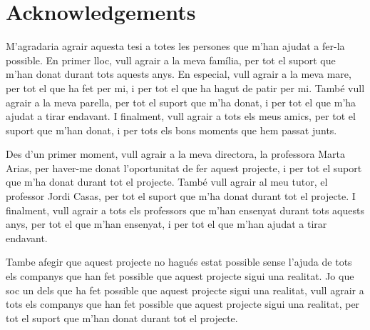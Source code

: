 \pagebreak
\thispagestyle{empty}
\section*{Acknowledgements}

M'agradaria agrair aquesta tesi a totes les persones que m'han ajudat a fer-la possible. En primer lloc, vull agrair a la meva família, per tot el suport que m'han donat durant tots aquests anys. En especial, vull agrair a la meva mare, per tot el que ha fet per mi, i per tot el que ha hagut de patir per mi. També vull agrair a la meva parella, per tot el suport que m'ha donat, i per tot el que m'ha ajudat a tirar endavant. I finalment, vull agrair a tots els meus amics, per tot el suport que m'han donat, i per tots els bons moments que hem passat junts.

Des d'un primer moment, vull agrair a la meva directora, la professora Marta Arias, per haver-me donat l'oportunitat de fer aquest projecte, i per tot el suport que m'ha donat durant tot el projecte. També vull agrair al meu tutor, el professor Jordi Casas, per tot el suport que m'ha donat durant tot el projecte. I finalment, vull agrair a tots els professors que m'han ensenyat durant tots aquests anys, per tot el que m'han ensenyat, i per tot el que m'han ajudat a tirar endavant.

Tambe afegir que aquest projecte no hagués estat possible sense l'ajuda de tots els companys que han fet possible que aquest projecte sigui una realitat. Jo que soc un dels que ha fet possible que aquest projecte sigui una realitat, vull agrair a tots els companys que han fet possible que aquest projecte sigui una realitat, per tot el suport que m'han donat durant tot el projecte.

\vfill